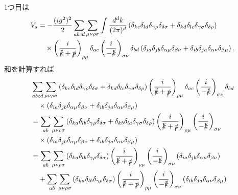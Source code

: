 1つ目は
\begin{align*}
  V_s &= - \frac{(ig^2)^2}{2} \sum_{abcd} \sum_{\mu\nu\rho\sigma} \int \frac{d^dk}{(2\pi)^d}
  \left( \delta_{kc} \delta_{ld} \delta_{\gamma\rho} \delta_{\delta\sigma} + \delta_{kd} \delta_{lc} \delta_{\gamma\sigma} \delta_{\delta\rho} \right) \\
  & \quad\times \left( \frac{i}{\slashed{k} + \slashed{p}} \right)_{\rho\mu} \delta_{ac}
  \left( \frac{i}{-\slashed{k}} \right)_{\sigma\nu} \delta_{bd}
  \left( \delta_{ia} \delta_{jb} \delta_{\alpha\mu} \delta_{\beta\nu} + \delta_{ib} \delta_{ja} \delta_{\alpha\nu} \delta_{\beta\mu} \right) .
\end{align*}
和を計算すれば
\begin{align*}
  & \sum_{abcd} \sum_{\mu\nu\rho\sigma}
  \left( \delta_{kc} \delta_{ld} \delta_{\gamma\rho} \delta_{\delta\sigma} + \delta_{kd} \delta_{lc} \delta_{\gamma\sigma} \delta_{\delta\rho} \right)
  \left( \frac{i}{\slashed{k} + \slashed{p}} \right)_{\rho\mu} \delta_{ac}
  \left( \frac{i}{-\slashed{k}} \right)_{\sigma\nu} \delta_{bd} \\
  & \quad\times \left( \delta_{ia} \delta_{jb} \delta_{\alpha\mu} \delta_{\beta\nu} + \delta_{ib} \delta_{ja} \delta_{\alpha\nu} \delta_{\beta\mu} \right) \\
  &= \sum_{ab} \sum_{\mu\nu\rho\sigma}
  \left( \delta_{ka} \delta_{lb} \delta_{\gamma\rho} \delta_{\delta\sigma} + \delta_{kb} \delta_{la} \delta_{\gamma\sigma} \delta_{\delta\rho} \right)
  \left( \frac{i}{\slashed{k} + \slashed{p}} \right)_{\rho\mu}
  \left( \frac{i}{-\slashed{k}} \right)_{\sigma\nu}
  \\
  & \quad\times \left( \delta_{ia} \delta_{jb} \delta_{\alpha\mu} \delta_{\beta\nu} + \delta_{ib} \delta_{ja} \delta_{\alpha\nu} \delta_{\beta\mu} \right) \\
  &= \sum_{ab} \sum_{\mu\nu\rho\sigma}
  \left( \delta_{ka} \delta_{lb} \delta_{\gamma\rho} \delta_{\delta\sigma} \right)
  \left( \frac{i}{\slashed{k} + \slashed{p}} \right)_{\rho\mu}
  \left( \frac{i}{-\slashed{k}} \right)_{\sigma\nu}
  \left( \delta_{ia} \delta_{jb} \delta_{\alpha\mu} \delta_{\beta\nu} \right) \\
  & \quad + \sum_{ab} \sum_{\mu\nu\rho\sigma}
  \left( \delta_{ka} \delta_{lb} \delta_{\gamma\rho} \delta_{\delta\sigma} \right)
  \left( \frac{i}{\slashed{k} + \slashed{p}} \right)_{\rho\mu}
  \left( \frac{i}{-\slashed{k}} \right)_{\sigma\nu}
  \left( \delta_{ib} \delta_{ja} \delta_{\alpha\nu} \delta_{\beta\mu} \right) \\

\end{align*}
